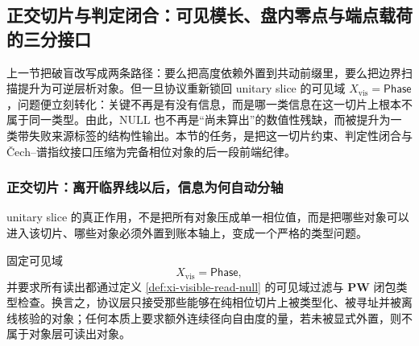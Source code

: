 \subsection{正交切片与判定闭合：可见模长、盘内零点与端点载荷的三分接口}\label{subsec:typed-address-biaxial-completion-orthogonal-slice-decidability}
上一节把破盲改写成两条路径：要么把高度依赖外置到共动前缀里，要么把边界扫描提升为可逆层析对象。但一旦协议重新锁回 unitary slice 的可见域 \(X_{\mathrm{vis}}=\mathsf{Phase}\)，问题便立刻转化：关键不再是有没有信息，而是哪一类信息在这一切片上根本不属于同一类型。由此，\(\mathrm{NULL}\) 也不再是“尚未算出”的数值性残缺，而被提升为一类带失败来源标签的结构性输出。本节的任务，是把这一切片约束、判定性闭合与 Čech--谱指纹接口压缩为完备相位对象的后一段前端纪律。

\subsubsection{正交切片：离开临界线以后，信息为何自动分轴}\label{subsubsec:typed-address-biaxial-completion-orthogonal-slice}
unitary slice 的真正作用，不是把所有对象压成单一相位值，而是把哪些对象可以进入该切片、哪些对象必须外置到账本轴上，变成一个严格的类型问题。

\begin{definition}\label{def:typed-address-biaxial-completion-unitary-visible-domain}
固定可见域
\[
X_{\mathrm{vis}}=\mathsf{Phase},
\]
并要求所有读出都通过定义 \ref{def:xi-visible-read-null} 的可见域过滤与 \(\mathbf{PW}\) 闭包类型检查。换言之，协议层只接受那些能够在纯相位切片上被类型化、被寻址并被离线核验的对象；任何本质上要求额外连续径向自由度的量，若未被显式外置，则不属于对象层可读出对象。
\end{definition}

